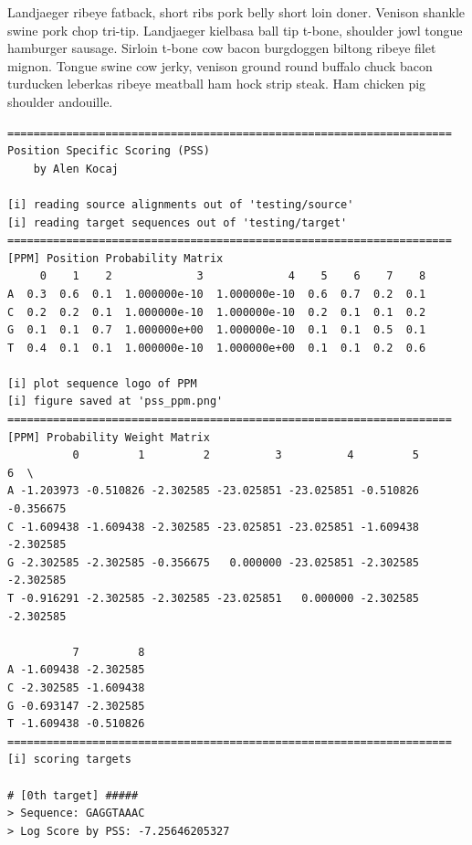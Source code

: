 \bigskip\noindent
Landjaeger ribeye fatback, short ribs pork belly short loin doner. Venison shankle swine pork chop tri-tip. Landjaeger kielbasa ball tip t-bone, shoulder jowl tongue hamburger sausage. Sirloin t-bone cow bacon burgdoggen biltong ribeye filet mignon. Tongue swine cow jerky, venison ground round buffalo chuck bacon turducken leberkas ribeye meatball ham hock strip steak. Ham chicken pig shoulder andouille.

\captionsetup[lstlisting]{format=hang, margin=5pt}
\begin{lstlisting}[caption=Der Konsolenoutput des PSS Programms. Als Zielsequenzen zum Berechnen eines Scores wurde dasselbe File verwendet\, wie zum Einlesen des alignierten Sequenzen.]
====================================================================
Position Specific Scoring (PSS)
	by Alen Kocaj

[i] reading source alignments out of 'testing/source'
[i] reading target sequences out of 'testing/target'
====================================================================
[PPM] Position Probability Matrix
	 0    1    2             3             4    5    6    7    8
A  0.3  0.6  0.1  1.000000e-10  1.000000e-10  0.6  0.7  0.2  0.1
C  0.2  0.2  0.1  1.000000e-10  1.000000e-10  0.2  0.1  0.1  0.2
G  0.1  0.1  0.7  1.000000e+00  1.000000e-10  0.1  0.1  0.5  0.1
T  0.4  0.1  0.1  1.000000e-10  1.000000e+00  0.1  0.1  0.2  0.6

[i] plot sequence logo of PPM
[i] figure saved at 'pss_ppm.png'
====================================================================
[PPM] Probability Weight Matrix
		  0         1         2          3          4         5         6  \
A -1.203973 -0.510826 -2.302585 -23.025851 -23.025851 -0.510826 -0.356675   
C -1.609438 -1.609438 -2.302585 -23.025851 -23.025851 -1.609438 -2.302585   
G -2.302585 -2.302585 -0.356675   0.000000 -23.025851 -2.302585 -2.302585   
T -0.916291 -2.302585 -2.302585 -23.025851   0.000000 -2.302585 -2.302585   

		  7         8  
A -1.609438 -2.302585  
C -2.302585 -1.609438  
G -0.693147 -2.302585  
T -1.609438 -0.510826  
====================================================================
[i] scoring targets

# [0th target] #####
> Sequence: GAGGTAAAC
> Log Score by PSS: -7.25646205327


\end{lstlisting}
